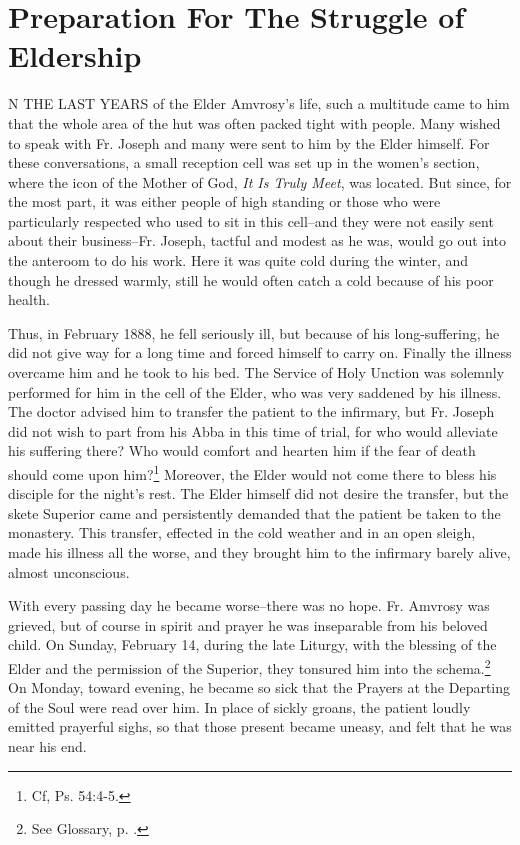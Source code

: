 \chapter{Preparation For The Struggle of Eldership}
N THE LAST YEARS of the Elder Amvrosy's life, such a multitude came to him that the whole area of the hut was often packed tight with people. Many wished to speak with Fr. Joseph and many were sent to him by the Elder himself. For these conversations, a small reception cell was set up in the women's section, where the icon of the Mother of God, \textit{It Is Truly Meet}, was located. But since, for the most part, it was either people of high standing or those who were particularly respected who used to sit in this cell--and they were not easily sent about their business--Fr. Joseph, tactful and modest as he was, would go out into the anteroom to do his work. Here it was quite cold during the winter, and though he dressed warmly, still he would often catch a cold because of his poor health.

Thus, in February 1888, he fell seriously ill, but because of his long-suffering, he did not give way for a long time and forced himself to carry on. Finally the illness overcame him and he took to his bed. The Service of Holy Unction was solemnly performed for him in the cell of the Elder, who was very saddened by his illness. The doctor advised him to transfer the patient to the infirmary, but Fr. Joseph did not wish to part from his Abba in this time of trial, for who would alleviate his suffering there? Who would comfort and hearten him if the fear of death should come upon him?\footnote{Cf, Ps. 54:4-5.} Moreover, the Elder would not come there to bless his disciple for the night's rest. The Elder himself did not desire the transfer, but the skete Superior came and persistently demanded that the patient be taken to the monastery. This transfer, effected in the cold weather and in an open sleigh, made his illness all the worse, and they brought him to the infirmary barely alive, almost unconscious.

With every passing day he became worse--there was no hope. Fr. Amvrosy was grieved, but of course in spirit and prayer he was inseparable from his beloved child. On Sunday, February 14, during the late Liturgy, with the blessing of the Elder and the permission of the Superior, they tonsured him into the schema.\footnote{See Glossary, p. \pageref{schema}.} On Monday, toward evening, he became so sick that the Prayers at the Departing of the Soul were read over him. In place of sickly groans, the patient loudly emitted prayerful sighs, so that those present became uneasy, and felt that he was near his end.

